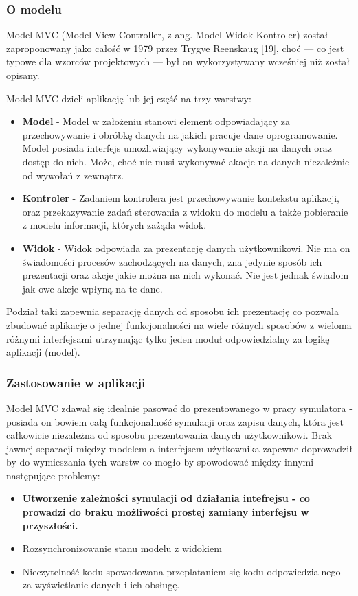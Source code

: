 \subsubsection{O modelu}
\par{
Model MVC (Model-View-Controller, z ang. Model-Widok-Kontroler) został zaproponowany jako całość w 1979 przez Trygve Reenskaug [19], choć --- co jest typowe dla wzorców projektowych --- był on wykorzystywany wcześniej niż został opisany. 
}
\par{
Model MVC dzieli aplikację lub jej część na trzy warstwy:
\begin{itemize}
\item \textbf{Model} - Model w założeniu stanowi element odpowiadający za przechowywanie i obróbkę danych na jakich pracuje dane oprogramowanie. Model posiada interfejs umożliwiający wykonywanie akcji na danych oraz dostęp do nich. Może, choć nie musi wykonywać akacje na danych niezależnie od wywołań z zewnątrz.
\item \textbf{Kontroler} - Zadaniem kontrolera jest przechowywanie kontekstu aplikacji, oraz przekazywanie zadań sterowania z widoku do modelu a także pobieranie z modelu informacji, których zażąda widok.
\item \textbf{Widok} - Widok odpowiada za prezentację danych użytkownikowi. Nie ma on świadomości procesów zachodzących na danych, zna jedynie sposób ich prezentacji oraz akcje jakie można na nich wykonać. Nie jest jednak świadom jak owe akcje wpłyną na te dane.
\end{itemize}
}
\par{
Podział taki zapewnia separację danych od sposobu ich prezentację co pozwala zbudować aplikacje o jednej funkcjonalności na wiele różnych sposobów z wieloma różnymi interfejsami utrzymując tylko jeden moduł odpowiedzialny za logikę aplikacji (model).
}
\subsubsection{Zastosowanie w aplikacji}
\par{
Model MVC zdawał się idealnie pasować do prezentowanego w pracy symulatora - posiada on bowiem całą funkcjonalność symulacji oraz zapisu danych, która jest całkowicie niezależna od sposobu prezentowania danych użytkownikowi. Brak jawnej separacji między modelem a interfejsem użytkownika zapewne doprowadził by do wymieszania tych warstw co mogło by spowodować między innymi następujące problemy:
\begin{itemize}
\item \textbf{Utworzenie zależności symulacji od działania intefrejsu - co prowadzi do braku możliwości prostej zamiany interfejsu w przyszłości.}
\item Rozsynchronizowanie stanu modelu z widokiem
\item Nieczytelność kodu spowodowana przeplataniem się kodu odpowiedzialnego za wyświetlanie danych i ich obsługę.
\end{itemize}
}
